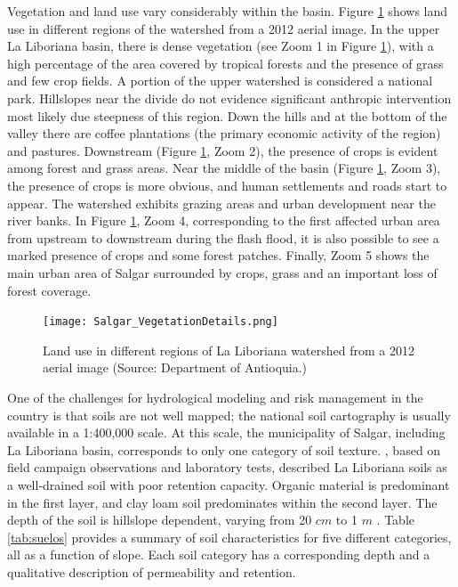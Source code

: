 \documentclass[hess, manuscript]{copernicus}
\begin{document}
Vegetation and land use vary considerably within the basin. Figure \ref{fig:landuse} shows land use in different regions of the watershed from a 2012 aerial image. In the upper La Liboriana basin, there is dense vegetation (see Zoom 1 in Figure \ref{fig:landuse}), with a high percentage of the area covered by tropical forests and the presence of grass and few crop fields.  A portion of the upper watershed is considered a national park. Hillslopes near the divide do not evidence significant anthropic intervention most likely due steepness of this region. Down the hills and at the bottom of the valley there are coffee plantations (the primary economic activity of the region) and pastures. Downstream (Figure \ref{fig:landuse}, Zoom 2), the presence of crops is evident among forest and grass areas. Near the middle of the basin (Figure \ref{fig:landuse}, Zoom 3), the presence of crops is more obvious, and human settlements and roads start to appear. The watershed exhibits grazing areas and urban development near the river banks. In Figure \ref{fig:landuse}, Zoom 4, corresponding to the first affected urban area from upstream to downstream during the flash flood, it is also possible to see a marked presence of crops and some forest patches. Finally, Zoom 5 shows the main urban area of Salgar surrounded by crops, grass and an important loss of forest coverage. \\

\begin{figure}[t]
\centering
\texttt{[image: Salgar\_VegetationDetails.png]}
\caption{Land use in different regions of La Liboriana watershed from a 2012 aerial image (Source: Department of Antioquia.)}
\label{fig:landuse}
\end{figure}


One of the challenges for hydrological modeling and risk management in the country is that soils are not well mapped; the national soil cartography is usually available in a 1:400,000 scale. At this scale, the municipality of Salgar, including La Liboriana basin,  corresponds to only one category of soil texture. \citet{Osorio2008}, based on field campaign observations and laboratory tests, described La Liboriana soils as a well-drained soil with poor retention capacity. Organic material is predominant in the first layer, and clay loam soil predominates within the second layer. The depth of the soil is hillslope dependent, varying from 20 $cm$ to 1 $m$ \citep{Osorio2008}. Table \ref{tab:suelos} provides a summary of soil characteristics for five different categories, all as a function of slope. Each soil category has a corresponding depth and a qualitative description of permeability and retention.\\
\end{document}
